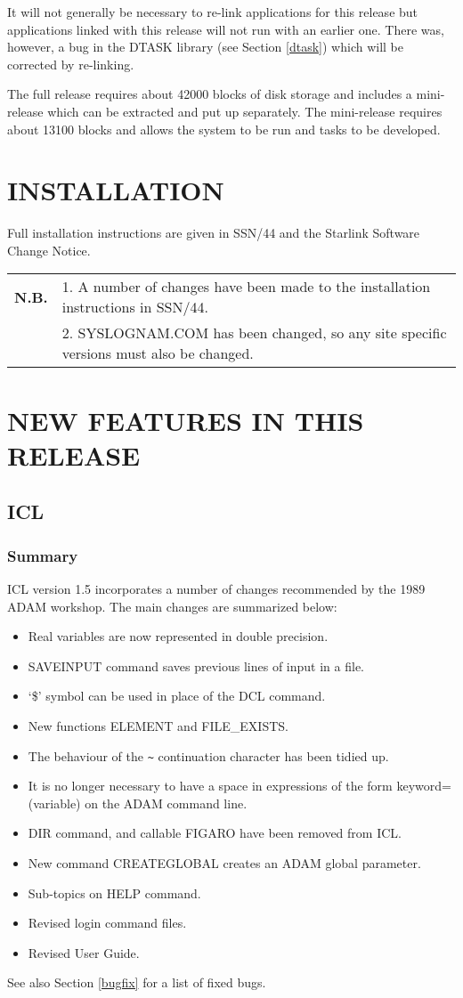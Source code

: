 It will not generally be necessary to re-link applications for this release but
applications linked with this release will not run with an earlier one.
There was, however, a bug in the DTASK library (see Section \ref{dtask})
which will be corrected by re-linking.

The full release requires about 42000 blocks of disk storage and includes a
mini-release which can be extracted and put up separately.
The mini-release requires about 13100 blocks and allows the system to be run
and tasks to be developed.

\section{INSTALLATION}
Full installation instructions are given in SSN/44 and the Starlink Software 
Change Notice.\\
\begin{tabular}{ll}
{\bf N.B.} & 1. A number of changes have been made to the installation 
instructions in SSN/44.\\
& 2. SYSLOGNAM.COM has been changed, so any site specific versions must
also be changed.\\
\end{tabular}

\section{NEW FEATURES IN THIS RELEASE}

\subsection{ICL}
\subsubsection{Summary}
ICL version 1.5 incorporates a number of changes recommended by the 1989
ADAM workshop. The main changes are summarized below:
\begin{itemize}
\item Real variables are now represented in double precision.
\item SAVEINPUT command saves previous lines of input in a file.
\item `\$' symbol can be used in place of the DCL command.
\item New functions ELEMENT and FILE\_EXISTS.
\item The behaviour of the \verb+~+ continuation character has been 
   tidied up.
\item It is no longer necessary to have a space in expressions of 
   the form keyword=(variable) on the ADAM command line.
\item DIR command, and callable FIGARO have been removed from ICL.
\item New command CREATEGLOBAL creates an ADAM global parameter.
\item Sub-topics on HELP command.
\item Revised login command files.
\item Revised User Guide.
\end{itemize}
See also Section \ref{bugfix} for a list of fixed bugs.

